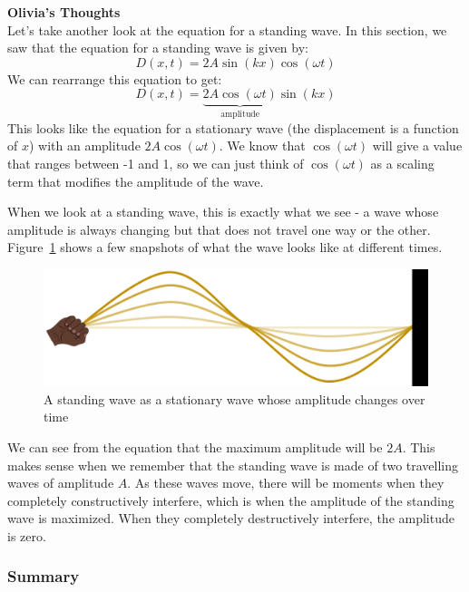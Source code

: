 \begin{framed}
\textbf{Olivia's Thoughts}\\
Let's take another look at the equation for a standing wave. In this section, we saw that the equation for a standing wave is given by:
\begin{equation}
D(x,t)=2A\sin(kx)\cos(\omega t)
\end{equation}
We can rearrange this equation to get:
\begin{equation}
D(x,t)=\underbrace{2A\cos(\omega t)}_{\textrm{amplitude}}\sin(kx)
\end{equation}
This looks like the equation for a stationary wave (the displacement is a function of $x$) with an amplitude $2A\cos(\omega t)$. We know that $\cos(\omega t)$ will give a value that ranges between -1 and 1, so we can just think of $\cos(\omega t)$ as a scaling term that modifies the amplitude of the wave.

When we look at a standing wave, this is exactly what we see - a wave whose amplitude is always changing but that does not travel one way or the other. Figure~\ref{fig:waves:standingwavetime} shows a few snapshots of what the wave looks like at different times.

\begin{figure}[!htbp]
\centering
\includegraphics[width=0.7\linewidth]{files/standingwavetime-2308ee7c08556ff565c9b9dd4e91c9bf.png}
\caption[]{A standing wave as a stationary wave whose amplitude changes over time}
\label{fig:waves:standingwavetime}
\end{figure}

We can see from the equation that the maximum amplitude will be $2A$. This makes sense when we remember that the standing wave is made of two travelling waves of amplitude $A$. As these waves move, there will be moments when they completely constructively interfere, which is when the amplitude of the standing wave is maximized. When they completely destructively interfere, the amplitude is zero.
\end{framed}

\subsubsection{Summary}

